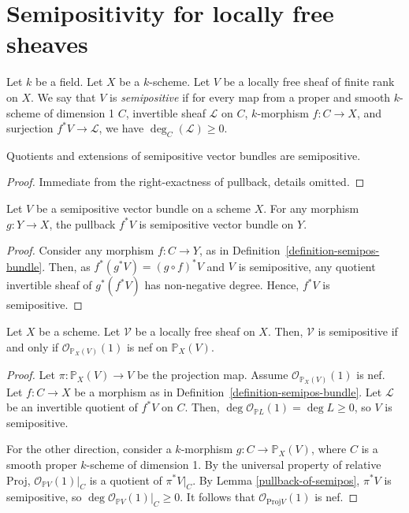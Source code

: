 \section{Semipositivity for locally free sheaves}

\begin{definition}
\label{definition-semipos-bundle}
Let $k$ be a field.
Let $X$ be a $k$-scheme.
Let $V$ be a locally free sheaf of finite rank on $X$.
We say that $V$ is \textit{semipositive} if for every map from a proper and
smooth $k$-scheme of dimension 1 $C$, invertible sheaf $\mathcal{L}$ on $C$,
$k$-morphism $f : C \to X$, and surjection $f^*V \to \mathcal{L}$, we have
$\deg_C(\mathcal{L}) \geq 0$.
\end{definition}

\begin{lemma}
Quotients and extensions of semipositive vector bundles are semipositive.
\end{lemma}

\begin{proof}
Immediate from the right-exactness of pullback, details omitted.
\end{proof}

\begin{lemma}
\label{pullback-of-semipos}
Let $V$ be a semipositive vector bundle on a scheme $X$.
For any morphism $g : Y \to X$, the pullback $f^*V$ is semipositive vector bundle
on $Y$.
\end{lemma}

\begin{proof}
Consider any morphism $f:C\to Y$, as in
Definition~\ref{definition-semipos-bundle}.
Then, as $f^*(g^*V)=(g\circ f)^*V$ and $V$ is semipositive, any quotient
invertible sheaf of $g^*(f^*V)$ has non-negative degree.
Hence, $f^*V$ is semipositive.
\end{proof}

\begin{lemma}\label{semipos=nef}
Let $X$ be a scheme.
Let $\mathcal{V}$ be a locally free sheaf on $X$.
Then, $\mathcal{V}$ is semipositive if and only if
$\mathcal{O}_{\mathbb{P}_X(V)}(1)$ is nef on $\mathbb{P}_X(V)$.
\end{lemma}

\begin{proof}
Let $\pi : \mathbb{P}_X(V) \to V$ be the projection map.
Assume $\mathcal{O}_{\mathbb{P}_X(V)}(1)$ is nef.
Let $f:C\to X$ be a morphism as in Definition~\ref{definition-semipos-bundle}.
Let $\mathcal{L}$ be an invertible quotient of $f^*V$ on $C$.
Then, $\deg \mathcal{O}_{\mathbb{P}L}(1)=\deg L\ge0$, so $V$ is semipositive.

For the other direction, consider a $k$-morphism $g:C\to\mathbb{P}_X(V)$, where
$C$ is a smooth proper $k$-scheme of dimension 1.
By the universal property of relative Proj, $\mathcal{O}_{\mathbb{P}V}(1)|_C$
is a quotient of $\pi^*V|_C$.
By Lemma \ref{pullback-of-semipos}, $\pi^*V$ is semipositive, so
$\deg\mathcal{O}_{\mathbb{P}V}(1)|_C\geq 0$.
It follows that $\mathcal{O}_{\mathrm{Proj} V}(1)$ is nef.
\end{proof}


